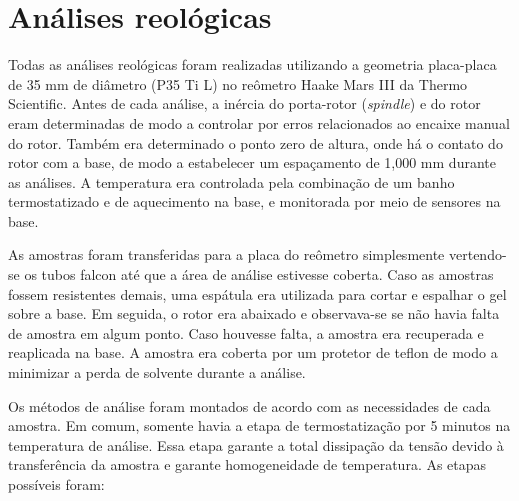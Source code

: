 		\section{Análises reológicas} 

		Todas as análises reológicas foram realizadas utilizando a geometria placa-placa de 35 mm de diâmetro (P35 Ti L) no reômetro Haake Mars III da Thermo Scientific. Antes de cada análise, a inércia do porta-rotor (\emph{spindle}) e do rotor eram determinadas de modo a controlar por erros relacionados ao encaixe manual do rotor. Também era determinado o ponto zero de altura, onde há o contato do rotor com a base, de modo a estabelecer um espaçamento de 1,000 mm durante as análises. A temperatura era controlada pela combinação de um banho termostatizado e de aquecimento na base, e monitorada por meio de sensores na base.
		
		As amostras foram transferidas para a placa do reômetro simplesmente vertendo-se os tubos falcon até que a área de análise estivesse coberta. Caso as amostras fossem resistentes demais, uma espátula era utilizada para cortar e espalhar o gel sobre a base. Em seguida, o rotor era abaixado e observava-se se não havia falta de amostra em algum ponto. Caso houvesse falta, a amostra era recuperada e reaplicada na base. A amostra era coberta por um protetor de teflon de modo a minimizar a perda de solvente durante a análise.
		
		Os métodos de análise foram montados de acordo com as necessidades de cada amostra. Em comum, somente havia a etapa de termostatização por 5 minutos na temperatura de análise. Essa etapa garante a total dissipação da tensão devido à transferência da amostra e garante homogeneidade de temperatura. As etapas possíveis foram:
		

